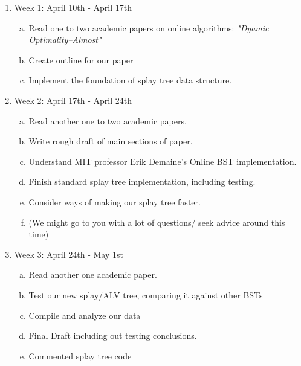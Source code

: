 \documentclass[11pt]{article}
\begin{document}
\begin{enumerate}[I]

\item {Week 1: April 10th - April 17th 
\begin{enumerate}[(a)]
\item Read one to two academic papers on online algorithms: \emph{"Dyamic Optimality--Almost"} 
\item Create outline for our paper
\item Implement the foundation of splay tree data structure.
\end{enumerate}
}

\item {Week 2: April 17th - April 24th
\begin{enumerate}[(a)]
\item Read another one to two academic papers.
\item Write rough draft of main sections of paper.
\item Understand MIT professor Erik Demaine’s Online BST implementation.
\item Finish standard splay tree implementation, including testing.
\item Consider ways of making our splay tree faster.
\item (We might go to you with a lot of questions/ seek advice around this time)   
\end{enumerate}}

\item{Week 3: April 24th - May 1st
\begin{enumerate}[(a)]
\item Read another one academic paper.
\item Test our new splay/ALV tree, comparing it against other BSTs
\item Compile and analyze our data
\item Final Draft including out testing conclusions.
\item Commented splay tree code
\end{enumerate}}
\end{enumerate}
\end{document}
